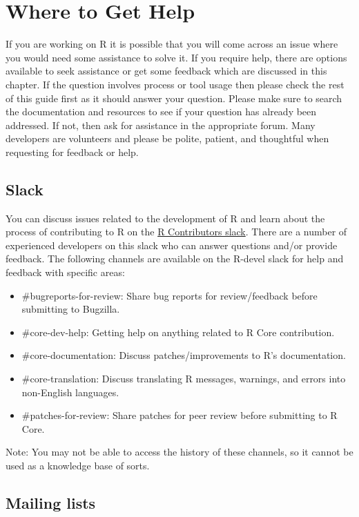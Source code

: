 \documentclass[
  letterpaper,
  DIV=11,
  numbers=noendperiod]{scrreprt}
\begin{document}
\chapter{Where to Get Help}\label{WhereToGetHelp}

If you are working on R it is possible that you will come across an
issue where you would need some assistance to solve it. If you require
help, there are options available to seek assistance or get some
feedback which are discussed in this chapter. If the question involves
process or tool usage then please check the rest of this guide first as
it should answer your question. Please make sure to search the
documentation and resources to see if your question has already been
addressed. If not, then ask for assistance in the appropriate forum.
Many developers are volunteers and please be polite, patient, and
thoughtful when requesting for feedback or help.

\section{Slack}\label{slack}

You can discuss issues related to the development of R and learn about
the process of contributing to R on the
\href{https://r-contributors.slack.com/}{R Contributors slack}. There
are a number of experienced developers on this slack who can answer
questions and/or provide feedback. The following channels are available
on the R-devel slack for help and feedback with specific areas:

\begin{itemize}
\item
  \#bugreports-for-review: Share bug reports for review/feedback before
  submitting to Bugzilla.
\item
  \#core-dev-help: Getting help on anything related to R Core
  contribution.
\item
  \#core-documentation: Discuss patches/improvements to R's
  documentation.
\item
  \#core-translation: Discuss translating R messages, warnings, and
  errors into non-English languages.
\item
  \#patches-for-review: Share patches for peer review before submitting
  to R Core.
\end{itemize}

Note: You may not be able to access the history of these channels, so it
cannot be used as a knowledge base of sorts.

\section{Mailing lists}\label{mailing-lists}
\end{document}
